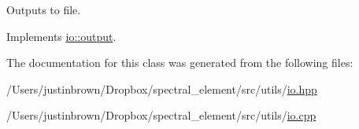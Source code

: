 Outputs to file. 



 

Implements \hyperlink{classio_1_1output_aae295dd37ca6397fcf8c2109f2c0e418}{io\-::output}.



The documentation for this class was generated from the following files\-:\begin{DoxyCompactItemize}
\item 
/\-Users/justinbrown/\-Dropbox/spectral\-\_\-element/src/utils/\hyperlink{io_8hpp}{io.\-hpp}\item 
/\-Users/justinbrown/\-Dropbox/spectral\-\_\-element/src/utils/\hyperlink{io_8cpp}{io.\-cpp}\end{DoxyCompactItemize}
